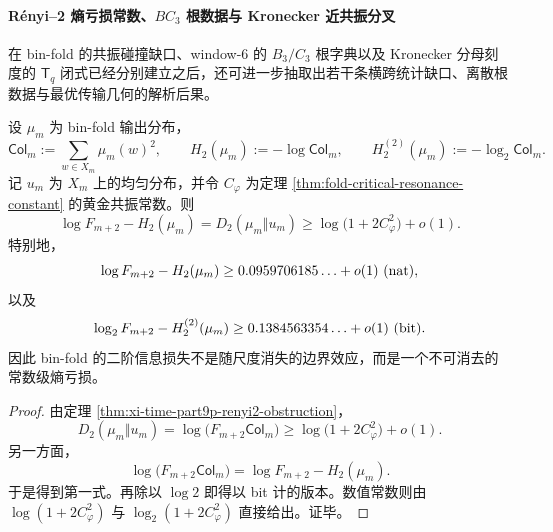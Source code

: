 \paragraph{Rényi--2 熵亏损常数、\texorpdfstring{$BC_3$}{BC3} 根数据与 Kronecker 近共振分叉}
在 bin-fold 的共振碰撞缺口、window-\(6\) 的 \(B_3/C_3\) 根字典以及 Kronecker 分母刻度的 \(\mathsf{T}_q\) 闭式已经分别建立之后，还可进一步抽取出若干条横跨统计缺口、离散根数据与最优传输几何的解析后果。

\begin{theorem}\label{thm:xi-binfold-renyi2-entropy-defect-constant}
设 \(\mu_m\) 为 bin-fold 输出分布，
\[
\mathsf{Col}_m:=\sum_{w\in X_m}\mu_m(w)^2,
\qquad
H_2(\mu_m):=-\log \mathsf{Col}_m,
\qquad
H_2^{(2)}(\mu_m):=-\log_2 \mathsf{Col}_m.
\]
记 \(u_m\) 为 \(X_m\) 上的均匀分布，并令 \(C_\varphi\) 为定理 \ref{thm:fold-critical-resonance-constant} 的黄金共振常数。则
\[
\log F_{m+2}-H_2(\mu_m)
=
D_2(\mu_m\Vert u_m)
\ge
\log\!\bigl(1+2C_\varphi^2\bigr)+o(1).
\]
特别地，
\[
\log F_{m+2}-H_2(\mu_m)\ge 0.0959706185\ldots+o(1)\ \text{\rm(nat)},
\]
以及
\[
\log_2 F_{m+2}-H_2^{(2)}(\mu_m)\ge 0.1384563354\ldots+o(1)\ \text{\rm(bit)}.
\]
因此 bin-fold 的二阶信息损失不是随尺度消失的边界效应，而是一个不可消去的常数级熵亏损。
\end{theorem}
\begin{proof}
由定理 \ref{thm:xi-time-part9p-renyi2-obstruction}，
\[
D_2(\mu_m\Vert u_m)=\log\!\bigl(F_{m+2}\mathsf{Col}_m\bigr)
\ge
\log\!\bigl(1+2C_\varphi^2\bigr)+o(1).
\]
另一方面，
\[
\log\!\bigl(F_{m+2}\mathsf{Col}_m\bigr)
=
\log F_{m+2}-H_2(\mu_m).
\]
于是得到第一式。再除以 \(\log 2\) 即得以 bit 计的版本。数值常数则由
\(\log(1+2C_\varphi^2)\) 与 \(\log_2(1+2C_\varphi^2)\) 直接给出。证毕。
\end{proof}

